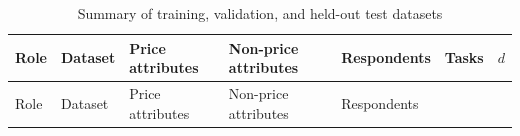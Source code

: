 \documentclass[
  11pt,
  letterpaper,
]{article}
\begin{document}
\begin{longtable}[]{@{}
  >{\raggedright\arraybackslash}p{}
  >{\raggedright\arraybackslash}p{}
  >{\raggedright\arraybackslash}p{}
  >{\raggedright\arraybackslash}p{}
  >{\raggedleft\arraybackslash}p{}
  >{\raggedleft\arraybackslash}p{}
  >{\raggedleft\arraybackslash}p{}@{}}
\caption{Summary of training, validation, and held-out test
datasets}\label{tbl-datasets}\tabularnewline
\toprule\noalign{}
\begin{minipage}[b]{\linewidth}\raggedright
Role
\end{minipage} & \begin{minipage}[b]{\linewidth}\raggedright
Dataset
\end{minipage} & \begin{minipage}[b]{\linewidth}\raggedright
Price attributes
\end{minipage} & \begin{minipage}[b]{\linewidth}\raggedright
Non-price attributes
\end{minipage} & \begin{minipage}[b]{\linewidth}\raggedleft
Respondents
\end{minipage} & \begin{minipage}[b]{\linewidth}\raggedleft
Tasks
\end{minipage} & \begin{minipage}[b]{\linewidth}\raggedleft
\(d\)
\end{minipage} \\
\midrule\noalign{}
\endfirsthead
\toprule\noalign{}
\begin{minipage}[b]{\linewidth}\raggedright
Role
\end{minipage} & \begin{minipage}[b]{\linewidth}\raggedright
Dataset
\end{minipage} & \begin{minipage}[b]{\linewidth}\raggedright
Price attributes
\end{minipage} & \begin{minipage}[b]{\linewidth}\raggedright
Non-price attributes
\end{minipage} & \begin{minipage}[b]{\linewidth}\raggedleft
Respondents

\end{minipage}
\end{longtable}
\end{document}
